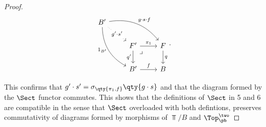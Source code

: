 \documentclass[main.tex]{subfiles}
\begin{document}
\begin{exercise}
\begin{enumerate}[(i),resume]
\begin{proof}
				$$ \begin{tikzcd}
					B'
					\arrow[drr, bend left, "g \cdot s \cdot f"]
					\arrow[ddr, bend right, "1_{B'}" {left}]
					\arrow[dr, dotted, "g' \cdot s'" description] & & \\
																  & F' \arrow[r, "\pi_{1}"] \arrow[d, "q'"{left}] \arrow[dr, phantom, "\lrcorner", very near start]
																  & F\arrow[d, "q"] \\
																  & B' \arrow[r,"f"]
																  & B
				\end{tikzcd} .$$

				This confirms that $g' \cdot s' = \sigma_{\qty{\pi_{1},f}}\qty{g
				\cdot s}$ and that the diagram formed by the $\Sect$ functor
				commutes. This shows that the definitions of $\Sect$ in 5 and 6
				are compatible in the sense that $\Sect$ overloaded with both
				defintions, preserves commutativity of diagrams formed by
				morphisms of $\Top /B$  and \(\Top^\two_\pb\)
			\end{proof}
	\end{enumerate}
\end{exercise}
\end{document}
